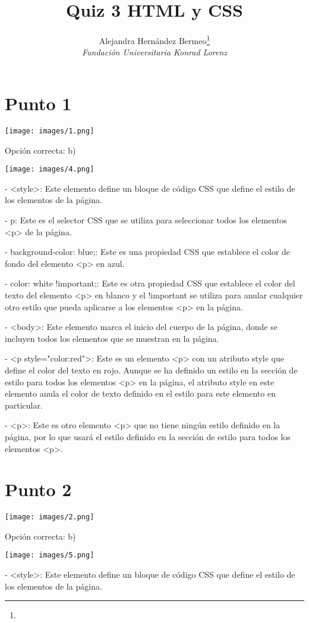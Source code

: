 \documentclass[journal, spanish]{IEEEtran}
\title{Quiz 3 HTML y CSS}
\author{Alejandra Hernández Bermeo\thanks{} \\
\textit{Fundación Universitaria Konrad Lorenz} \\
}
\begin{document}
\maketitle


\section{Punto 1}
\begin{center}
  \texttt{[image: images/1.png]}
    \end{center}
Opción correcta:
 b) \begin{center}
  \texttt{[image: images/4.png]}
    \end{center}
- <style>: Este elemento define un bloque de código CSS que define el estilo de los elementos de la página.

- p: Este es el selector CSS que se utiliza para seleccionar todos los elementos <p> de la página.

- background-color: blue;: Este es una propiedad CSS que establece el color de fondo del elemento <p> en azul.

- color: white !important;: Este es otra propiedad CSS que establece el color del texto del elemento <p> en blanco y el !important se utiliza para anular cualquier otro estilo que pueda aplicarse a los elementos <p> en la página.

- <body>: Este elemento marca el inicio del cuerpo de la página, donde se incluyen todos los elementos que se muestran en la página.

- <p style="color:red">: Este es un elemento <p> con un atributo style que define el color del texto en rojo. Aunque se ha definido un estilo en la sección de estilo para todos los elementos <p> en la página, el atributo style en este elemento anula el color de texto definido en el estilo para este elemento en particular.

- <p>: Este es otro elemento <p> que no tiene ningún estilo definido en la página, por lo que usará el estilo definido en la sección de estilo para todos los elementos <p>.


\section{Punto 2}
\begin{center}
\texttt{[image: images/2.png]}
  \end{center}
Opción correcta:
b) \begin{center}
  \texttt{[image: images/5.png]}
    \end{center}
- <style>: Este elemento define un bloque de código CSS que define el estilo de los elementos de la página.
\end{document}
